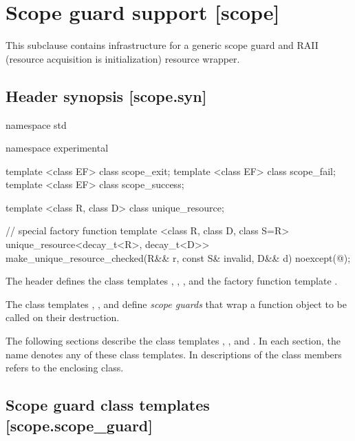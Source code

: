 \documentclass[ebook,11pt,article]{memoir}
\begin{document}
\section{Scope guard support [scope]}
This subclause contains infrastructure for a generic scope guard and RAII (resource acquisition is initialization) resource wrapper.\\

\subsection{Header  synopsis [scope.syn]}


\begin{codeblock}
namespace std {
namespace experimental {
template <class EF>
  class scope_exit;
template <class EF>
  class scope_fail;
template <class EF>
  class scope_success;

template <class R, class D>
  class unique_resource;

// special factory function
template <class R, class D, class S=R>
  unique_resource<decay_t<R>, decay_t<D>>
  make_unique_resource_checked(R&& r, const S& invalid, D&& d) noexcept(@\seebelow@);
}}
\end{codeblock}

\pnum
The header   defines the class templates , , ,  and
the factory function template .

\pnum 
The class templates , , and  define\emph{ scope guards} that wrap a function object to be called on their destruction.

\pnum
The following sections describe the class templates , , and . In each section, the name  denotes any of these class templates. In descriptions of the class members  refers to the enclosing class.

\newpage
\subsection {Scope guard class templates [scope.scope_guard]}
\end{document}
